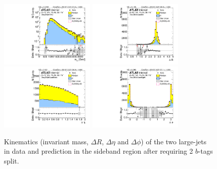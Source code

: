 \begin{figure}[htb!]
\begin{center}
\includegraphics[width=0.41\textwidth,angle=-90]{figures/boosted/Sideband/b77_TwoTag_split_Sideband_mHH_l_1.pdf}
\includegraphics[width=0.41\textwidth,angle=-90]{figures/boosted/Sideband/b77_TwoTag_split_Sideband_hCandDr.pdf}\\
\includegraphics[width=0.41\textwidth,angle=-90]{figures/boosted/Sideband/b77_TwoTag_split_Sideband_hCandDeta.pdf}
\includegraphics[width=0.41\textwidth,angle=-90]{figures/boosted/Sideband/b77_TwoTag_split_Sideband_hCandDphi.pdf}
  \caption{Kinematics (invariant mass, $\Delta R$, $\Delta \eta$ and $\Delta \phi$) of the two large-\R jets in data and prediction in the sideband region after requiring 2 $b$-tags split. }
  \label{fig:boosted-2bs-sideband-ak10-system}
\end{center}
\end{figure}

\clearpage
